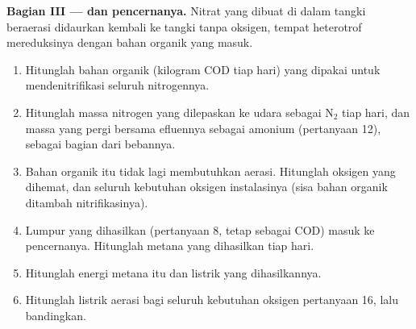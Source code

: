 \begin{problem}
\medskip
\noindent\textbf{Bagian III ---  dan pencernanya.}
Nitrat yang dibuat di dalam tangki beraerasi didaurkan kembali ke tangki
tanpa oksigen, tempat heterotrof mereduksinya dengan bahan organik yang masuk.
\begin{enumerate}[resume]
  \item Hitunglah bahan organik (kilogram COD tiap hari) yang dipakai
        untuk mendenitrifikasi seluruh nitrogennya.
  \item Hitunglah massa nitrogen yang dilepaskan ke udara sebagai
        $\mathrm{N_2}$ tiap hari, dan massa yang pergi bersama efluennya
        sebagai amonium (pertanyaan 12), sebagai bagian dari bebannya.
  \item Bahan organik itu tidak lagi membutuhkan aerasi. Hitunglah
        oksigen yang dihemat, dan seluruh kebutuhan oksigen instalasinya
        (sisa bahan organik ditambah nitrifikasinya).
  \item Lumpur yang dihasilkan (pertanyaan 8, tetap sebagai COD) masuk ke
        pencernanya. Hitunglah metana yang dihasilkan tiap hari.
  \item Hitunglah energi metana itu dan listrik yang dihasilkannya.
  \item Hitunglah listrik aerasi bagi seluruh kebutuhan oksigen
        pertanyaan 16, lalu bandingkan.
\end{enumerate}


\end{problem}
